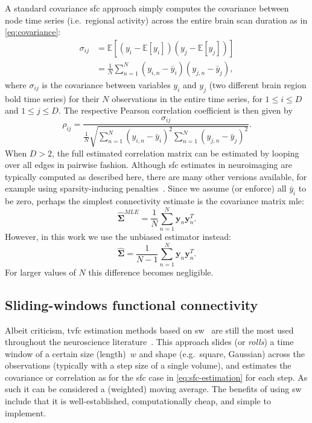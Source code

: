 A standard covariance \gls{sfc} approach simply computes the covariance between node time series (i.e.~regional activity) across the entire brain scan duration as in \cref{eq:covariance}:
\begin{equation}
  \begin{aligned}
    \sigma_{ij} & = \mathbb{E}[(y_i - \mathbb{E}[y_i])(y_j - \mathbb{E}[y_j])] \\ & = \frac{1}{N} \sum_{n=1}^N (y_{i,n} - \bar y_i)(y_{j,n} - \bar y_j),
  \end{aligned}
\end{equation}
where $\sigma_{ij}$ is the covariance between variables $y_i$ and $y_j$ (two different brain region \gls{bold} time series) for their $N$ observations in the entire time series, for $1 \leq i \leq D$ and $1 \leq j \leq D$.
The respective Pearson correlation coefficient is then given by
\begin{equation}
  \label{eq:sfc-estimation}
  \rho_{ij} = \frac{\sigma_{ij}}{\frac{1}{N} \sqrt{\sum_{n=1}^N (y_{i,n} - \bar y_i)^2 \sum_{n=1}^N (y_{j,n} - \bar y_j)^2}}.
\end{equation}
When $D > 2$, the full estimated correlation matrix can be estimated by looping over all edges in pairwise fashion.
Although \gls{sfc} estimates in neuroimaging are typically computed as described here, there are many other versions available, for example using sparsity-inducing penalties~\parencite{Foti2019}.
%
Since we assume (or enforce) all $\bar y_i$ to be zero, perhaps the simplest connectivity estimate is the covariance matrix \gls{mle}:
\begin{equation}
  \hat{\mathbf{\Sigma}}^{MLE} = \frac{1}{N} \sum_{n=1}^N \mathbf{y}_{n} \mathbf{y}_{n}^T.
\end{equation}
However, in this work we use the unbiased estimator instead:
\begin{equation}
  \hat{\mathbf{\Sigma}} = \frac{1}{N - 1} \sum_{n=1}^N \mathbf{y}_{n} \mathbf{y}_{n}^T.
\end{equation}
For larger values of $N$ this difference becomes negligible.

\subsection{Sliding-windows functional connectivity}\label{subsec:sliding-windows-fc}

Albeit criticism, \gls{tvfc} estimation methods based on \gls{sw}~\parencite{Chang2010, Sakoglu2010, Allen2014, Shakil2016, Preti2017} are still the most used throughout the neuroscience literature~\parencite{Lurie2020}.
%
This approach slides (or \emph{rolls}) a time window of a certain size (length)~$w$ and shape (e.g.~square, Gaussian) across the observations (typically with a step size of a single volume), and estimates the covariance or correlation as for the \gls{sfc} case in \cref{eq:sfc-estimation} for each step.
As such it can be considered a (weighted) moving average.
The benefits of using \gls{sw} include that it is well-established, computationally cheap, and simple to implement.

